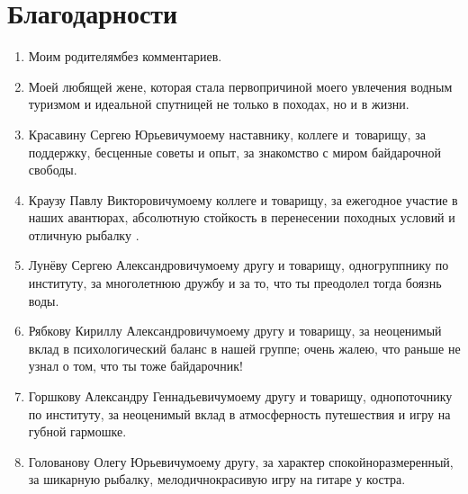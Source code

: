\newpage
{
\thispagestyle{empty}
\section*{Благодарности}

\begin{enumerate}
\item Моим родителям\mdash без комментариев.
%
\item Моей любящей жене, которая стала первопричиной моего увлечения водным туризмом и идеальной спутницей не только в походах, но и в жизни.
%
\item Красавину\: Сергею\: Юрьевичу\mdash моему наставнику, коллеге и~товарищу, за поддержку, бесценные советы и опыт, за знакомство с миром байдарочной свободы.
%
\item Краузу\: Павлу\: Викторовичу\mdash моему коллеге и товарищу, за ежегодное участие в наших авантюрах, абсолютную стойкость в перенесении походных условий и отличную рыбалку .
%
\item Лунёву\: Сергею\: Александровичу\mdash моему другу и товарищу, одногруппнику по институту, за многолетнюю дружбу и за то, что ты преодолел тогда боязнь воды.
%
\item Рябкову\: Кириллу\: Александровичу\mdash моему другу и товарищу, за неоценимый вклад в психологический баланс в нашей группе; очень жалею, что раньше не узнал о том, что ты тоже байдарочник!
%
\item Горшкову\: Александру\: Геннадьевичу\mdash моему другу и товарищу, однопоточнику по институту, за неоценимый вклад в атмосферность путешествия и игру на губной гармошке.
%
\item Голованову\: Олегу\: Юрьевичу\mdash моему другу, за характер спокойно\sdash размеренный, за шикарную рыбалку, мелодично\sdash красивую игру на гитаре у костра.

\end{enumerate}
}
